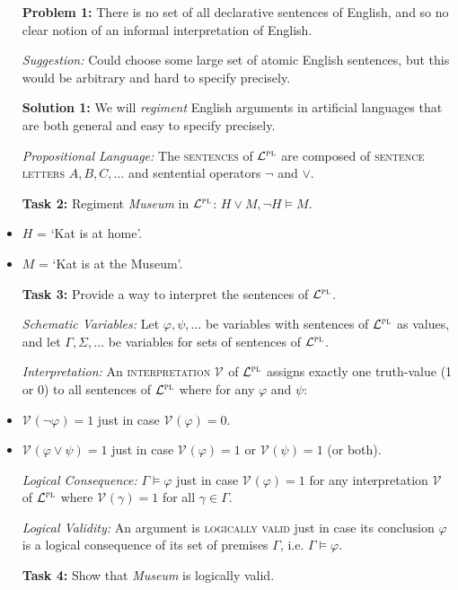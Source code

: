 \documentclass[a4paper, 11pt]{article} %
\newcommand{\I}{\mathcal{I}}
\newcommand{\V}[1]{\mathcal{V}_{#1}} %
\newcommand{\PL}{\mathcal{L}^{\textsc{pl}}}
\begin{document}
\begin{itemize}[leftmargin=1in,labelsep=.15in]
  \item[\bf Problem 1:] There is no set of all declarative sentences of English, and so no clear notion of an informal interpretation of English.
  \item[\it Suggestion:] Could choose some large set of atomic English sentences, but this would be arbitrary and hard to specify precisely.
  \item[\bf Solution 1:] We will \textit{regiment} English arguments in artificial languages that are both general and easy to specify precisely.
  \item[\it Propositional Language:] The \textsc{sentences} of $\PL$ are composed of \textsc{sentence letters} $A, B, C, \ldots$ and sentential operators $\neg$ and $\vee$.
  \item[\bf Task 2:] Regiment \textit{Museum} in $\PL$: $H\vee M, \neg H \vDash M$.
    \item $H$ = `Kat is at home'. 
    \item $M$ = `Kat is at the Museum'. 
  \item[\bf Task 3:] Provide a way to interpret the sentences of $\PL$.
  \item[\it Schematic Variables:] Let $\varphi, \psi, \ldots$ be variables with sentences of $\PL$ as values, and let $\Gamma, \Sigma, \ldots$ be variables for sets of sentences of $\PL$. 
  \item[\it Interpretation:] An \textsc{interpretation} $\V{}$ of $\PL$ assigns exactly one truth-value (1 or 0) to all sentences of $\PL$ where for any $\varphi$ and $\psi$: 
  \item $\V{}(\neg\varphi)=1$ just in case $\V{}(\varphi)=0$.
  \item $\V{}(\varphi\vee\psi)=1$ just in case $\V{}(\varphi)=1$ or $\V{}(\psi)=1$ (or both).
  \item[\it Logical Consequence:] $\Gamma \vDash \varphi$ just in case $\V{}(\varphi)=1$ for any interpretation $\V{}$ of $\PL$ where $\V{}(\gamma)=1$ for all $\gamma \in \Gamma$.
  \item[\it Logical Validity:] An argument is \textsc{logically valid} just in case its conclusion $\varphi$ is a logical consequence of its set of premises $\Gamma$, i.e. $\Gamma \vDash \varphi$.
  \item[\bf Task 4:] Show that \textit{Museum} is logically valid.
\end{itemize}
\end{document}
